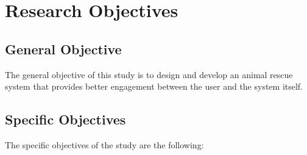 \section{Research Objectives}
\label{sec:researchobjectives}

\subsection{General Objective}
\label{sec:generalobjective}

The general objective of this study is to design and develop an animal rescue
system that provides better engagement between the user and the system itself.


\subsection{Specific Objectives}
\label{sec:specificobjectives}

%
%

The specific objectives of the study are the following:


